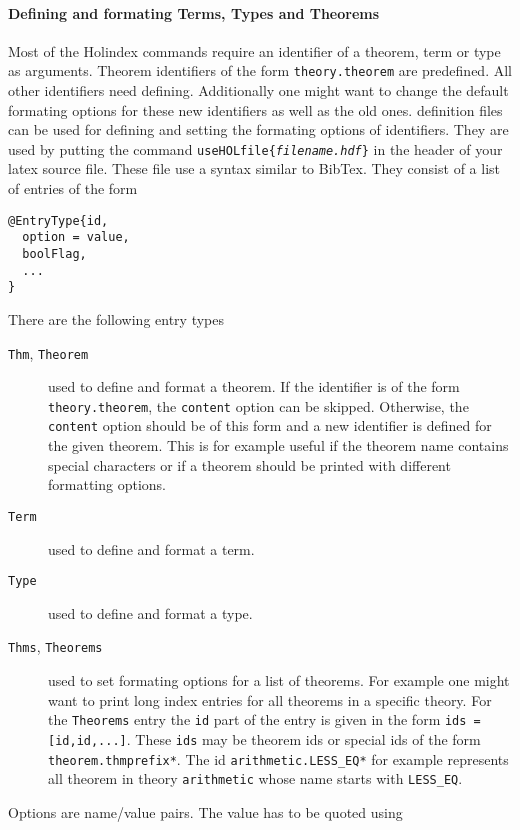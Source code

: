 

\paragraph{Defining and formating Terms, Types and Theorems}

  Most of the Holindex commands require an identifier of a theorem,
  term or type as arguments. Theorem identifiers of the form
  \texttt{theory.theorem} are predefined. All other identifiers need
  defining. Additionally one might want to change the default
  formating options for these new identifiers as well as the old ones.
  \HOL{} definition files can be used for defining and
  setting the formating options of identifiers. They are used by
  putting the command \texttt{\bs{}useHOLfile\{\textit{filename.hdf}\}} in
  the header of your latex source file. These file use a syntax similar to
  BibTex. They consist of a list of entries of the form
  \begin{verbatim}
@EntryType{id,
  option = value,
  boolFlag,
  ...
}
\end{verbatim}
\noindent
There are the following entry types
\begin{description}
\item[\texttt{Thm}, \texttt{Theorem}] used to define and format a
  theorem. If the identifier is of the form \texttt{theory.theorem},
  the \texttt{content} option can be skipped. Otherwise, the
  \texttt{content} option should be of this form and a new identifier
  is defined for the given theorem. This is for example useful if the
  theorem name contains special characters or if a theorem should
  be printed with different formatting options.
  \item[\texttt{Term}]
    used to define and format a term.
  \item[\texttt{Type}]
    used to define and format a type.
  \item[\texttt{Thms}, \texttt{Theorems}] used to set formating options for
    a list of theorems. For example one might want to print long index entries
    for all theorems in a specific theory. For the \texttt{Theorems} entry
    the \texttt{id} part of the entry is given in the form
    \texttt{ids = [id,id,...]}. These \texttt{ids} may be theorem ids or special
    ids of the form \texttt{theorem.thmprefix*}. The id
    \texttt{arithmetic.LESS\_EQ*} for example represents all theorem in
    theory \texttt{arithmetic} whose name starts with \texttt{LESS\_EQ}.
\end{description}
Options are name/value pairs. The value has to be quoted using
